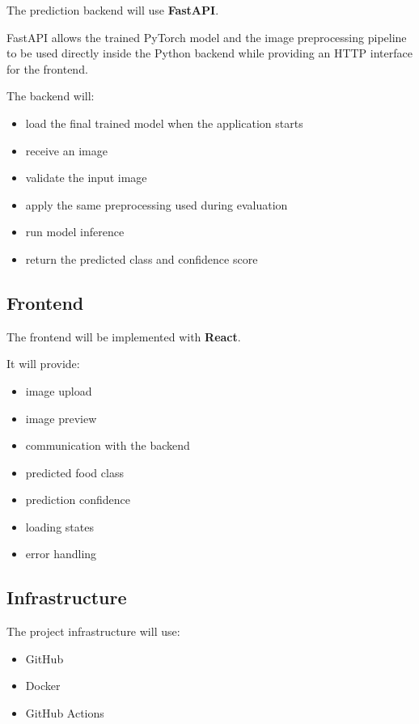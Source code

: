 \documentclass[11pt,a4paper]{article}
\begin{document}
The prediction backend will use \textbf{FastAPI}.

FastAPI allows the trained PyTorch model and the image preprocessing pipeline to be
used directly inside the Python backend while providing an HTTP interface for the
frontend.

The backend will:

\begin{itemize}
    \item load the final trained model when the application starts
    \item receive an image
    \item validate the input image
    \item apply the same preprocessing used during evaluation
    \item run model inference
    \item return the predicted class and confidence score
\end{itemize}

\subsection{Frontend}

The frontend will be implemented with \textbf{React}.

It will provide:

\begin{itemize}
    \item image upload
    \item image preview
    \item communication with the backend
    \item predicted food class
    \item prediction confidence
    \item loading states
    \item error handling
\end{itemize}

\subsection{Infrastructure}

The project infrastructure will use:

\begin{itemize}
    \item GitHub
    \item Docker
    \item GitHub Actions
\end{itemize}
\end{document}
